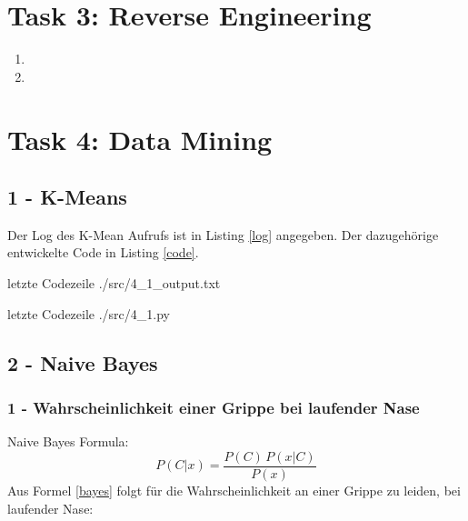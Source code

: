 \section*{Task 3: Reverse Engineering}
\begin{enumerate}
	\item
	\item
\end{enumerate}

\section*{Task 4: Data Mining}
\subsection*{1 - K-Means}
Der Log des K-Mean Aufrufs ist in Listing \ref{log} angegeben. Der dazugehörige entwickelte Code in Listing \ref{code}.

 letzte Codezeile
{./src/4_1_output.txt}

 letzte Codezeile
{./src/4_1.py}

\subsection*{2 - Naive Bayes}
\subsubsection*{1 - Wahrscheinlichkeit einer Grippe bei laufender Nase}
Naive Bayes Formula:
\begin{equation}
P(C|x) = \frac{P(C)\, P(x|C)}{P(x)}
\label{bayes}
\end{equation}
Aus Formel \ref{bayes} folgt für die Wahrscheinlichkeit an einer Grippe zu leiden, bei laufender Nase:

